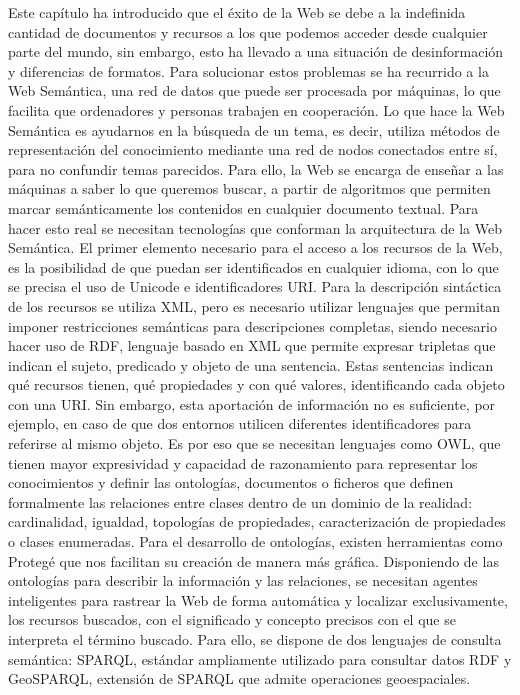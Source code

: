 Este capítulo ha introducido que el éxito de la Web se debe a la indefinida cantidad de documentos y recursos a los que podemos acceder desde cualquier parte del mundo, sin embargo, esto ha llevado a una situación de desinformación y diferencias de formatos. Para solucionar estos problemas se ha recurrido a la Web Semántica, una red de datos que puede ser procesada por máquinas, lo que facilita que ordenadores y personas trabajen en cooperación. Lo que hace la Web Semántica es ayudarnos en la búsqueda de un tema, es decir, utiliza métodos de representación del conocimiento mediante una red de nodos conectados entre sí, para no confundir temas parecidos. Para ello, la Web se encarga de enseñar a las máquinas a saber lo que queremos buscar, a partir de algoritmos que permiten marcar semánticamente los contenidos en cualquier documento textual. Para hacer esto real se necesitan tecnologías que conforman la arquitectura de la Web Semántica. El primer elemento necesario para el acceso a los recursos de la Web, es la posibilidad de que puedan ser identificados en cualquier idioma, con lo que se precisa el uso de Unicode e identificadores URI. Para la descripción sintáctica de los recursos se utiliza XML, pero es necesario utilizar lenguajes que permitan imponer restricciones semánticas para descripciones completas, siendo necesario hacer uso de RDF, lenguaje basado en XML que permite expresar tripletas que indican el sujeto, predicado y objeto de una sentencia. Estas sentencias indican qué recursos tienen, qué propiedades y con qué valores, identificando cada objeto con una URI. Sin embargo, esta aportación de información no es suficiente, por ejemplo, en caso de que dos entornos utilicen diferentes identificadores para referirse al mismo objeto. Es por eso que se necesitan lenguajes como OWL, que tienen mayor expresividad y capacidad de razonamiento para representar los conocimientos y definir las ontologías, documentos o ficheros que definen formalmente las relaciones entre clases dentro de un dominio de la realidad: cardinalidad, igualdad, topologías de propiedades, caracterización de propiedades o clases enumeradas. Para el desarrollo de ontologías, existen herramientas como Protegé que nos facilitan su creación de manera más gráfica. Disponiendo de las ontologías para describir la información y las relaciones, se necesitan agentes inteligentes para rastrear la Web de forma automática y localizar exclusivamente, los recursos buscados, con el significado y concepto precisos con el que se interpreta el término buscado. Para ello, se dispone de dos lenguajes de consulta semántica: SPARQL, estándar ampliamente utilizado para consultar datos RDF y GeoSPARQL, extensión de SPARQL que admite operaciones geoespaciales.

